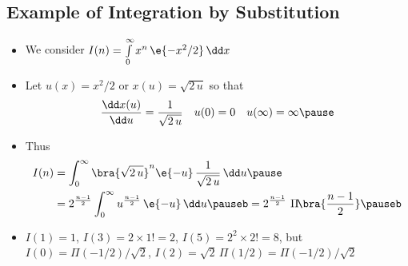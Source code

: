 \begin{slide}
\section[-2]{Example of Integration by Substitution}

\begin{PauseHighLight}
  \begin{itemize}
  \item We consider $I(n) = \int\limits_0^\infty x^n\, \e{-x^2/2} \, \dd x$\pause
  \item Let $u(x) =x^2/2$ or $x(u) = \sqrt{2\,u}$ so that
    \begin{align*}
      \frac{\dd x(u)}{\dd u} &= \frac{1}{\sqrt{2\,u}} & u(0)&=0 & u(\infty)
                                                            = \infty\pause
    \end{align*}
  \item Thus
    \begin{align*}
      I(n) &= \int_0^\infty \bra{\sqrt{2\,u}}^{n}\e{-u}\, \frac{1}{\sqrt{2\,u}} \, 
      \dd u\pause\\
      &= 2^{\frac{n-1}{2}} \int_0^\infty  u^{\frac{n-1}{2}} \, \e{-u}\,
      \dd u \pauseb = 2^{\frac{n-1}{2}}\,\, \Pi\!\bra{\frac{n-1}{2}}\pauseb
    \end{align*}
  \item $I(1) = 1$\pauseb, $I(3)=2\times1!=2$\pauseb,
    $I(5)=2^2\times2!=8$\pauseb, but $I(0)=
    \Pi(-1/2)/\sqrt{2}$\pauseb, $I(2)= \sqrt{2}\,\Pi(1/2)=
    \Pi(-1/2)/\sqrt{2}$\pauseb
  \end{itemize}
\end{PauseHighLight}

\end{slide}




